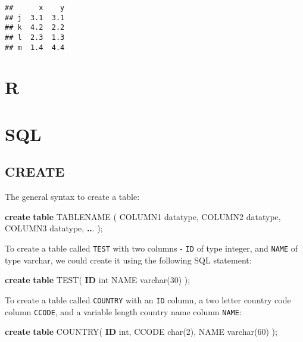 \documentclass[
]{book}
\newenvironment{Shaded}{\begin{snugshade}}{\end{snugshade}}
\newcommand{\DataTypeTok}[1]{\textcolor[rgb]{0.13,0.29,0.53}{#1}}
\newcommand{\DecValTok}[1]{\textcolor[rgb]{0.00,0.00,0.81}{#1}}
\newcommand{\KeywordTok}[1]{\textcolor[rgb]{0.13,0.29,0.53}{\textbf{#1}}}
\newcommand{\NormalTok}[1]{#1}
\newcommand{\OperatorTok}[1]{\textcolor[rgb]{0.81,0.36,0.00}{\textbf{#1}}}
\begin{document}
\begin{verbatim}
##      x    y
## j  3.1  3.1
## k  4.2  2.2
## l  2.3  1.3
## m  1.4  4.4
\end{verbatim}

\hypertarget{r}{%
\chapter{R}\label{r}}

\hypertarget{sql}{%
\chapter{SQL}\label{sql}}

\hypertarget{create}{%
\section{CREATE}\label{create}}

The general syntax to create a table:

\begin{Shaded}
\begin{Highlighting}[]
\KeywordTok{create} \KeywordTok{table}\NormalTok{ TABLENAME (}
\NormalTok{  COLUMN1 datatype, }
\NormalTok{  COLUMN2 datatype, }
\NormalTok{  COLUMN3 datatype, }
  \OperatorTok{..}\NormalTok{. );}
\end{Highlighting}
\end{Shaded}

To create a table called \texttt{TEST} with two columns - \texttt{ID} of type integer, and \texttt{NAME} of type varchar, we could create it using the following SQL statement:

\begin{Shaded}
\begin{Highlighting}[]
\KeywordTok{create} \KeywordTok{table}\NormalTok{ TEST(}
  \KeywordTok{ID} \DataTypeTok{int}
\NormalTok{  NAME }\DataTypeTok{varchar}\NormalTok{(}\DecValTok{30}\NormalTok{)}
\NormalTok{);}
\end{Highlighting}
\end{Shaded}

To create a table called \texttt{COUNTRY} with an \texttt{ID} column, a two letter country code column \texttt{CCODE}, and a variable length country name column \texttt{NAME}:

\begin{Shaded}
\begin{Highlighting}[]
\KeywordTok{create} \KeywordTok{table}\NormalTok{ COUNTRY(}
    \KeywordTok{ID} \DataTypeTok{int}\NormalTok{,}
\NormalTok{    CCODE }\DataTypeTok{char}\NormalTok{(}\DecValTok{2}\NormalTok{),}
\NormalTok{    NAME }\DataTypeTok{varchar}\NormalTok{(}\DecValTok{60}\NormalTok{)}
\NormalTok{);}
\end{Highlighting}
\end{Shaded}
\end{document}
